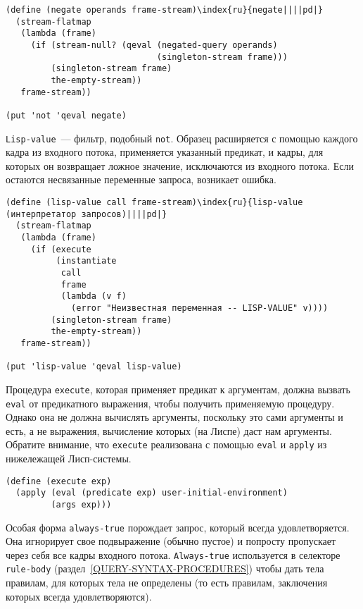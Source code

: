 \begin{Verbatim}[fontsize=\small]
(define (negate operands frame-stream)\index{ru}{negate||||pd|}
  (stream-flatmap
   (lambda (frame)
     (if (stream-null? (qeval (negated-query operands)
                              (singleton-stream frame)))
         (singleton-stream frame)
         the-empty-stream))
   frame-stream))

(put 'not 'qeval negate)
\end{Verbatim}

{\tt Lisp-value}~--- 
фильтр, подобный 
{\tt not}. Образец расширяется с помощью каждого кадра из
входного потока, применяется указанный предикат, и кадры, для которых
он возвращает ложное значение, исключаются из входного потока.  Если
остаются несвязанные переменные запроса, возникает ошибка.

\begin{Verbatim}[fontsize=\small]
(define (lisp-value call frame-stream)\index{ru}{lisp-value (интерпретатор запросов)||||pd|}
  (stream-flatmap
   (lambda (frame)
     (if (execute
          (instantiate
           call
           frame
           (lambda (v f)
             (error "Неизвестная переменная -- LISP-VALUE" v))))
         (singleton-stream frame)
         the-empty-stream))
   frame-stream))

(put 'lisp-value 'qeval lisp-value)
\end{Verbatim}

Процедура {\tt execute}, которая применяет
предикат к аргументам, должна вызвать {\tt eval} от
предикатного выражения, чтобы получить применяемую процедуру.  Однако
она не должна вычислять аргументы, поскольку это сами аргументы и
есть, а не выражения, вычисление которых (на Лиспе) даст нам
аргументы.  Обратите внимание, что {\tt execute} реализована с
помощью {\tt eval} и {\tt apply} из нижележащей
Лисп-системы.

\begin{Verbatim}[fontsize=\small]
(define (execute exp)
  (apply (eval (predicate exp) user-initial-environment)
         (args exp)))
\end{Verbatim}

Особая форма {\tt always-true} порождает запрос,
который всегда удовлетворяется.  Она игнорирует свое подвыражение
(обычно пустое) и попросту пропускает через себя все кадры входного
потока. {\tt Always-true} используется в селекторе
{\tt rule-body} (раздел~\ref{QUERY-SYNTAX-PROCEDURES})
чтобы дать тела правилам, для которых  тела не определены (то есть
правилам, заключения которых всегда удовлетворяются).

